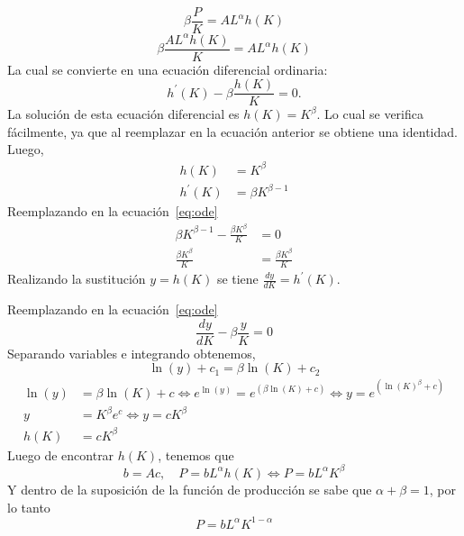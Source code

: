 \begin{equation}
\beta\frac{P}{K}=AL^{\alpha}h\left(K\right)
\end{equation}
\begin{equation}
\beta\frac{AL^{\alpha}h\left(K\right)}{K}=AL^{\alpha}h\left(K\right)
\end{equation}
La cual se convierte en una ecuación diferencial ordinaria:
\begin{equation}\label{eq:ode}
h^{\prime}\left(K\right)-\beta\frac{h\left(K\right)}{K}=0.
\end{equation}
La solución de esta ecuación diferencial es $h\left(K\right)=K^{\beta}$. Lo cual se verifica fácilmente, ya que al reemplazar en la ecuación anterior se obtiene una identidad. Luego,
\begin{align}
h\left(K\right)
&=K^{\beta}\\
h^{\prime}\left(K\right)
&=\beta K^{\beta-1}
\end{align}
Reemplazando en la ecuación~\eqref{eq:ode}
\begin{align*}
\beta K^{\beta-1}-\frac{\beta K^{\beta}}{K}
&=0\\
\frac{\beta K^{\beta}}{K}
&=\frac{\beta K^{\beta}}{K}
\end{align*}
Realizando la sustitución $y=h\left(K\right)$ se tiene $\frac{dy}{dK}=h^{\prime}\left(K\right)$.

Reemplazando en la ecuación~\eqref{eq:ode}
\begin{equation}
\frac{dy}{dK}-\beta\frac{y}{K}=0
\end{equation}
Separando variables e integrando obtenemos,
\begin{equation}
\ln\left(y\right)+c_{1}=\beta\ln\left(K\right)+c_{2}
\end{equation}
\begin{align*}
\ln\left(y\right)
&=\beta\ln\left(K\right)+c\iff e^{\ln\left(y\right)}=e^{\left(\beta\ln\left(K\right)+c\right)}\iff y=e^{\left(\ln\left(K\right)^{\beta}+c\right)}\\
y&=K^{\beta}e^{c}\iff y=cK^{\beta}\\
h\left(K\right)&=cK^{\beta}
\end{align*}
Luego de encontrar $h\left(K\right)$, tenemos que \[ b=Ac,\quad P=bL^{\alpha}h\left(K\right)\iff P=bL^{\alpha}K^{\beta} \] Y dentro de la suposición de la función de producción se sabe que $\alpha+\beta=1$, por lo tanto
\begin{equation}\label{eq:P}
P=bL^{\alpha}K^{1-\alpha}
\end{equation}
